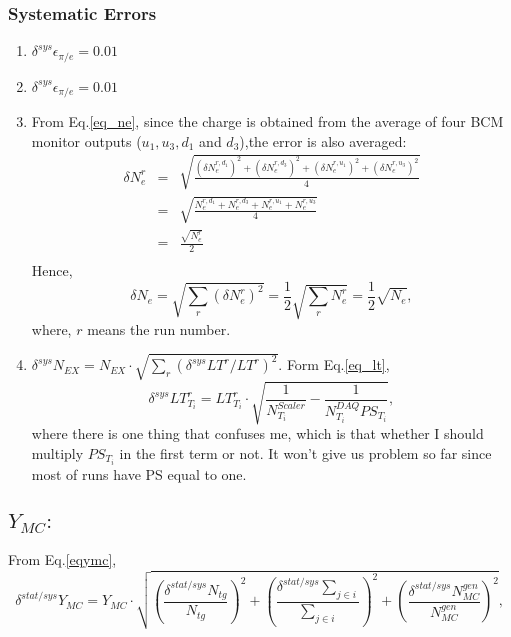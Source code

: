 \documentclass[a4paper,12.pt]{article}
\begin{document}
\subsubsection{Systematic Errors}
\begin{enumerate}

\item $\delta^{sys} \epsilon_{\pi/e} = 0.01$

\item $\delta^{sys} \epsilon_{\pi/e} = 0.01$

\item From Eq.\ref{eq_ne}, since the charge is obtained from the average of four BCM monitor outputs ($u_{1},u_{3},d_{1}$ and $d_{3}$),the error is also averaged:
\begin{eqnarray*}
  \delta N_{e}^{r} &=& \sqrt{\frac{(\delta N_{e}^{r,d_{1}})^{2}+(\delta N_{e}^{r,d_{3}})^{2}+(\delta N_{e}^{r,u_{1}})^{2}+(\delta N_{e}^{r,u_{3}})^{2}}{4}}\\
                  &=& \sqrt{\frac{N_{e}^{r,d_{1}}+N_{e}^{r,d_{3}}+N_{e}^{r,u_{1}}+N_{e}^{r,u_{3}}}{4}}\\
                  &=& \frac{\sqrt{N_{e}^{r}}}{2} \\
\end{eqnarray*}
Hence,
\begin{equation}
  \delta N_{e} = \sqrt{\sum_{r}(\delta N_{e}^{r})^{2}}=\frac{1}{2}\sqrt{\sum_{r}N_{e}^{r}}=\frac{1}{2}\sqrt{N_{e}},
\end{equation}
where, $r$ means the run number.

\item $\delta^{sys} N_{EX} = N_{EX} \cdot \sqrt{ \sum_{r} (\delta^{sys} LT^{r}/LT^{r})^{2}}$. Form Eq.\ref{eq_lt},
\begin{equation}
  \delta^{sys} LT^{r}_{T_{i}} = LT^{r}_{T_{i}} \cdot \sqrt{\frac{1}{N_{T_{i}}^{Scaler}}-\frac{1}{N_{T_{i}}^{DAQ} PS_{T_{i}}}},
\end{equation}
where there is one thing that confuses me, which is that whether I should multiply $PS_{T_{i}}$ in the first term or not. It won't give us problem so far since most of runs have PS equal to one.

\end{enumerate}

\subsection{$Y_{MC}:$} 

From Eq.\ref{eqymc},
\begin{equation}
  \delta^{stat/sys} Y_{MC} =  Y_{MC} \cdot \sqrt{(\frac{\delta^{stat/sys} N_{tg}}{N_{tg}})^{2}+(\frac{\delta^{stat/sys}\sum_{j\in i}}{\sum_{j\in i}})^{2}+(\frac{\delta^{stat/sys} N_{MC}^{gen}}{N_{MC}^{gen}})^{2}},
\end{equation}
\end{document}
